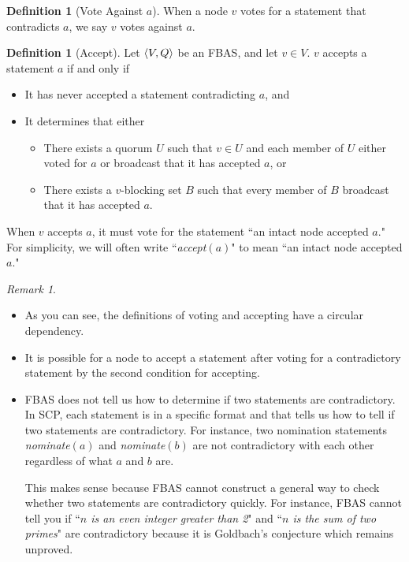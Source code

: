 \documentclass[12pt, psamsfonts]{amsart}
\theoremstyle{definition}
\newtheorem{defn}[thm]{Definition}
\theoremstyle{remark}
\newtheorem{rem}[thm]{Remark}
\numberwithin{equation}{subsection}
\begin{document}
\begin{defn}[Vote Against $a$]\label{def_vote_against_a}
    When a node $v$ votes for a statement that contradicts $a$, we say $v$ votes against $a$.
\end{defn}

\begin{defn}[Accept]\label{def_accept}
    Let $\ev{V, Q}$ be an FBAS\@, and let $v \in V$.
    $v$ accepts a statement $a$ if and only if 
    \begin{itemize}
        \item
            It has never accepted a statement contradicting $a$, and
        \item
            It determines that either
            \begin{itemize}
                \item
                    There exists a quorum $U$ such that $v \in U$ and each member of $U$ either voted for $a$ or broadcast that it has accepted $a$, or
                \item
                    There exists a $v$-blocking set $B$ such that every member of $B$ broadcast that it has accepted $a$.
            \end{itemize}
    \end{itemize}

    When $v$ accepts $a$, it must vote for the statement ``an intact node accepted $a$."
    For simplicity, we will often write ``\textit{accept}$(a)$" to mean ``an intact node accepted $a$."
\end{defn}

\begin{rem}
    $ $
    \begin{itemize}
        \item
            As you can see, the definitions of voting and accepting have a circular dependency.
        \item
            It is possible for a node to accept a statement after voting for a contradictory statement by the second condition for accepting.
        \item
            FBAS does not tell us how to determine if two statements are contradictory.
            In SCP, each statement is in a specific format and that tells us how to tell if two statements are contradictory.
            For instance, two nomination statements \textit{nominate}$(a)$ and \textit{nominate}$(b)$ are not contradictory with each other regardless of what $a$ and $b$ are.

            This makes sense because FBAS cannot construct a general way to check whether two statements are contradictory quickly.
            For instance, FBAS cannot tell you if ``\textit{$n$ is an even integer greater than 2}" and ``\textit{$n$ is the sum of two primes}" are contradictory because it is Goldbach's conjecture which remains unproved.
    \end{itemize}
\end{rem}
\end{document}
